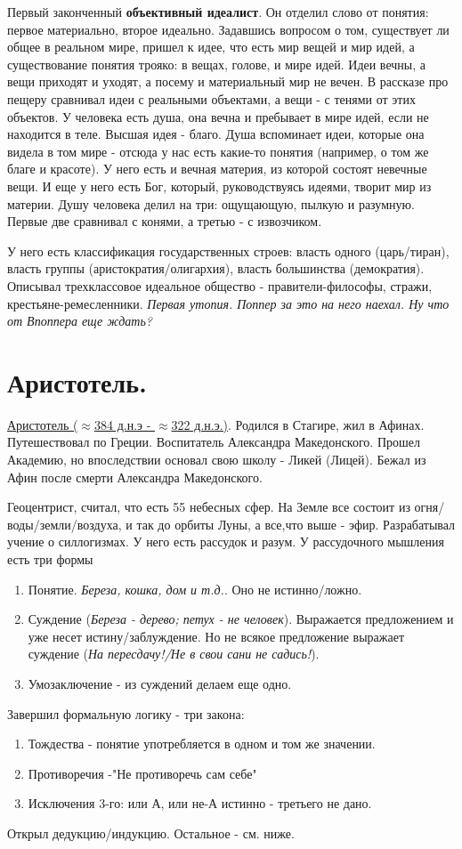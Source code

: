 Первый законченный \textbf{объективный идеалист}. Он отделил слово от понятия: первое материально, второе идеально. Задавшись вопросом о том, существует ли общее в реальном мире, пришел к идее, что есть мир вещей и мир идей, а существование понятия трояко: в вещах, голове, и мире идей. Идеи вечны, а вещи приходят и уходят, а посему и материальный мир не вечен. В рассказе про пещеру сравнивал идеи с реальными объектами, а вещи - с тенями от этих объектов. У человека есть душа, она вечна и пребывает в мире идей, если не находится в теле. Высшая идея - благо. Душа вспоминает идеи, которые она видела в том мире - отсюда у нас есть какие-то понятия (например, о том же благе и красоте).
У него есть и вечная материя, из которой состоят невечные вещи. И еще у него есть Бог, который, руководствуясь идеями, творит мир из материи. Душу человека делил на три: ощущающую, пылкую и разумную. Первые две сравнивал с конями, а третью - с извозчиком.

У него есть классификация государственных строев: власть одного (царь/тиран), власть группы (аристократия/олигархия), власть большинства (демократия). Описывал трехклассовое идеальное общество - правители-философы, стражи, крестьяне-ремесленники. \textit{Первая утопия. Поппер за это на него наехал. Ну что от Впоппера еще ждать?}

\section{Аристотель.}
\underline{Аристотель ($\approx$384 д.н.э - $\approx$322 д.н.э.)}. Родился в Стагире, жил в Афинах. Путешествовал по Греции. Воспитатель Александра Македонского. Прошел Академию, но впоследствии основал свою школу - Ликей (Лицей). Бежал из Афин после смерти Александра Македонского.

Геоцентрист, считал, что есть 55 небесных сфер. На Земле все состоит из огня/воды/земли/воздуха, и так до орбиты Луны, а все,что выше - эфир. 
Разрабатывал учение о силлогизмах. У него есть рассудок и разум. У рассудочного мышления есть три формы
\begin{enumerate}
\item Понятие. \textit{Береза, кошка, дом и т.д.}. Оно не истинно/ложно.
\item Суждение (\textit{Береза - дерево; петух - не человек}). Выражается предложением и уже несет истину/заблуждение. Но не всякое предложение выражает суждение (\textit{На пересдачу!/Не в свои сани не садись!}). 
\item Умозаключение - из суждений делаем еще одно. 
\end{enumerate}
Завершил формальную логику - три закона:
\begin{enumerate}
\item Тождества - понятие употребляется в одном и том же значении.
\item Противоречия -"Не противоречь сам себе"
\item Исключения 3-го: или А, или не-А истинно - третьего не дано. 
\end{enumerate}
Открыл дедукцию/индукцию.
Остальное - см. ниже.

